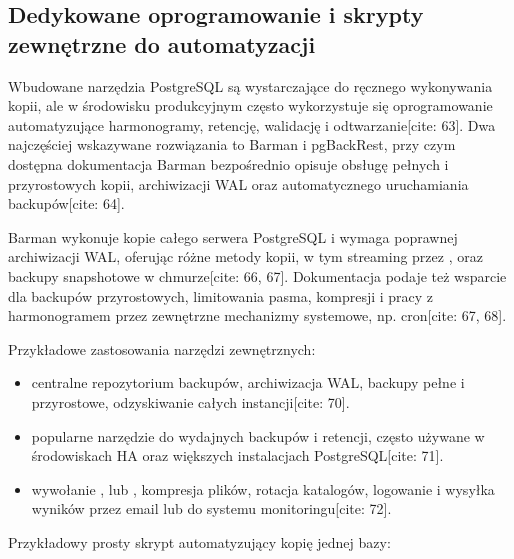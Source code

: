 \documentclass[letterpaper,10pt,polish]{sphinxmanual}
\begin{document}
\subsection{Dedykowane oprogramowanie i skrypty zewnętrzne do automatyzacji}
\label{\detokenize{rozdzial_2/rozdzial_28/index:dedykowane-oprogramowanie-i-skrypty-zewnetrzne-do-automatyzacji}}
\sphinxAtStartPar
Wbudowane narzędzia PostgreSQL są wystarczające do ręcznego wykonywania kopii, ale w środowisku produkcyjnym często wykorzystuje się oprogramowanie automatyzujące harmonogramy, retencję, walidację i odtwarzanie{[}cite: 63{]}. Dwa najczęściej wskazywane rozwiązania to Barman i pgBackRest, przy czym dostępna dokumentacja Barman bezpośrednio opisuje obsługę pełnych i przyrostowych kopii, archiwizacji WAL oraz automatycznego uruchamiania backupów{[}cite: 64{]}.

\sphinxAtStartPar
Barman wykonuje kopie całego serwera PostgreSQL i wymaga poprawnej archiwizacji WAL, oferując różne metody kopii, w tym streaming przez ,  oraz backupy snapshotowe w chmurze{[}cite: 66, 67{]}. Dokumentacja podaje też wsparcie dla backupów przyrostowych, limitowania pasma, kompresji i pracy z harmonogramem przez zewnętrzne mechanizmy systemowe, np. cron{[}cite: 67, 68{]}.

\sphinxAtStartPar
Przykładowe zastosowania narzędzi zewnętrznych:
\begin{itemize}
\item {} 
\sphinxAtStartPar
{} centralne repozytorium backupów, archiwizacja WAL, backupy pełne i przyrostowe, odzyskiwanie całych instancji{[}cite: 70{]}.

\item {} 
\sphinxAtStartPar
{} popularne narzędzie do wydajnych backupów i retencji, często używane w środowiskach HA oraz większych instalacjach PostgreSQL{[}cite: 71{]}.

\item {} 
\sphinxAtStartPar
{} wywołanie ,  lub , kompresja plików, rotacja katalogów, logowanie i wysyłka wyników przez e\sphinxhyphen{}mail lub do systemu monitoringu{[}cite: 72{]}.

\end{itemize}

\sphinxAtStartPar
Przykładowy prosty skrypt automatyzujący kopię jednej bazy:
\end{document}
